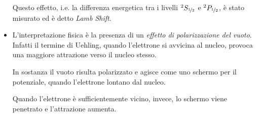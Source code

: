 \documentclass[../main.tex]{subfiles}
\begin{document}
\begin{nota}
\begin{itemize}
        Questo effetto, i.e. la differenza energetica tra i livelli \(^2S_{\nicefrac{1}{2}}\) e \(^2P_{\nicefrac{1}{2}}\), è stato misurato ed è detto \textit{Lamb Shift}.
    
        \item L'interpretazione fisica è la presenza di un \textit{effetto di polarizzazione del vuoto}. Infatti il termine di Uehling, quando l'elettrone si avvicina al nucleo, provoca una maggiore attrazione verso il nucleo stesso.
    
        In sostanza il vuoto risulta polarizzato e agisce come uno schermo per il potenziale, quando l'elettrone lontano dal nucleo.
    
        Quando l'elettrone è sufficientemente vicino, invece, lo schermo viene penetrato e l'attrazione aumenta.
    \end{itemize}
    \label{note:uehlingterm_lambshift}
\end{nota}
\end{document}
